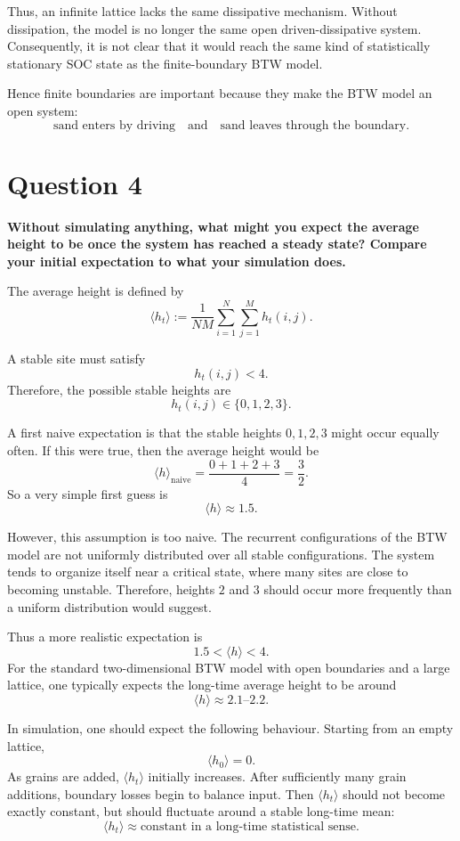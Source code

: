 Thus, an infinite lattice lacks the same dissipative mechanism. Without dissipation, the model is no longer the same open driven-dissipative system. Consequently, it is not clear that it would reach the same kind of statistically stationary SOC state as the finite-boundary BTW model.

Hence finite boundaries are important because they make the BTW model an open system:
\[
    \text{sand enters by driving}
    \quad\text{and}\quad
    \text{sand leaves through the boundary}.
\]

\section*{Question 4}

\textbf{Without simulating anything, what might you expect the average height to be once the system has reached a steady state? Compare your initial expectation to what your simulation does.}

The average height is defined by
\[
    \langle h_t\rangle
    :=
    \frac{1}{NM}\sum_{i=1}^{N}\sum_{j=1}^{M}h_t(i,j).
\]

A stable site must satisfy
\[
    h_t(i,j)<4.
\]
Therefore, the possible stable heights are
\[
    h_t(i,j)\in\{0,1,2,3\}.
\]

A first naive expectation is that the stable heights $0,1,2,3$ might occur equally often. If this were true, then the average height would be
\[
    \langle h\rangle_{\mathrm{naive}}
    =
    \frac{0+1+2+3}{4}
    =
    \frac{3}{2}.
\]
So a very simple first guess is
\[
    \langle h\rangle\approx 1.5.
\]

However, this assumption is too naive. The recurrent configurations of the BTW model are not uniformly distributed over all stable configurations. The system tends to organize itself near a critical state, where many sites are close to becoming unstable. Therefore, heights $2$ and $3$ should occur more frequently than a uniform distribution would suggest.

Thus a more realistic expectation is
\[
    1.5<\langle h\rangle<4.
\]
For the standard two-dimensional BTW model with open boundaries and a large lattice, one typically expects the long-time average height to be around
\[
    \langle h\rangle \approx 2.1\text{--}2.2.
\]

In simulation, one should expect the following behaviour. Starting from an empty lattice,
\[
    \langle h_0\rangle=0.
\]
As grains are added, $\langle h_t\rangle$ initially increases. After sufficiently many grain additions, boundary losses begin to balance input. Then $\langle h_t\rangle$ should not become exactly constant, but should fluctuate around a stable long-time mean:
\[
    \langle h_t\rangle \approx \text{constant in a long-time statistical sense}.
\]

